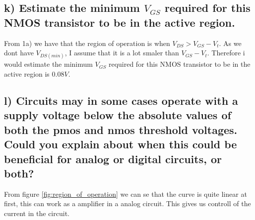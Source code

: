 \subsection*{k) Estimate the minimum \( V_{G S} \) required for this NMOS transistor to be in the active region.}
From 1a) we have that the region of operation is when $V_{DS}>V_{GS}-V_t$. As we dont have $V_{DS(min)}$, I assume that it is a lot smaler than $V_{GS}-V_t$. Therefore i would estimate the minimum \( V_{G S} \) required for this NMOS transistor to be in the active region is $0.08V$.

\subsection*{l) Circuits may in some cases operate with a supply voltage below the absolute values of both the pmos and nmos threshold voltages. Could you explain about when this could be beneficial for analog or digital circuits, or both?}
From figure \ref{fig:region_of_operation} we can se that the curve is quite linear at first, this can work as a amplifier in a analog circuit. This gives us controll of the current in the circuit.